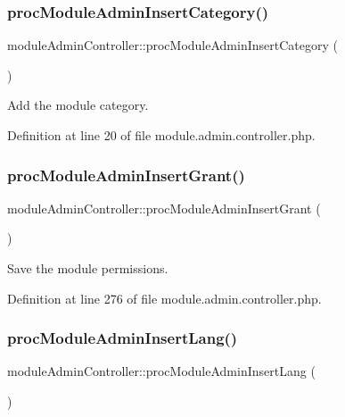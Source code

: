 \subsubsection{\texorpdfstring{proc\+Module\+Admin\+Insert\+Category()}{procModuleAdminInsertCategory()}}
{\footnotesize\ttfamily module\+Admin\+Controller\+::proc\+Module\+Admin\+Insert\+Category (\begin{DoxyParamCaption}{ }\end{DoxyParamCaption})}



Add the module category. 



Definition at line 20 of file module.\+admin.\+controller.\+php.

\hypertarget{classmoduleAdminController_ac0d7a96f80e9c24260292f3caa9552e6}{}\label{classmoduleAdminController_ac0d7a96f80e9c24260292f3caa9552e6} 
\subsubsection{\texorpdfstring{proc\+Module\+Admin\+Insert\+Grant()}{procModuleAdminInsertGrant()}}
{\footnotesize\ttfamily module\+Admin\+Controller\+::proc\+Module\+Admin\+Insert\+Grant (\begin{DoxyParamCaption}{ }\end{DoxyParamCaption})}



Save the module permissions. 



Definition at line 276 of file module.\+admin.\+controller.\+php.

\hypertarget{classmoduleAdminController_a302990c618bc055b581dbf26722b3560}{}\label{classmoduleAdminController_a302990c618bc055b581dbf26722b3560} 
\subsubsection{\texorpdfstring{proc\+Module\+Admin\+Insert\+Lang()}{procModuleAdminInsertLang()}}
{\footnotesize\ttfamily module\+Admin\+Controller\+::proc\+Module\+Admin\+Insert\+Lang (\begin{DoxyParamCaption}{ }\end{DoxyParamCaption})}



